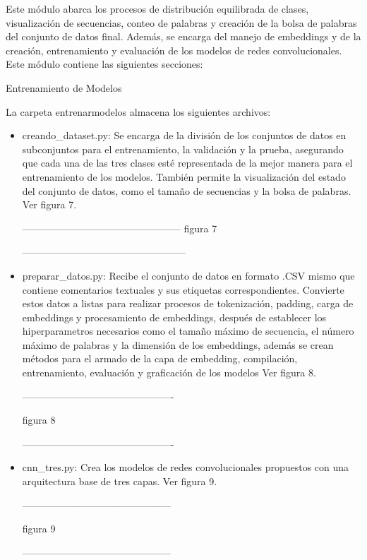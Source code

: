 Este módulo abarca los procesos de distribución equilibrada de clases, visualización de secuencias, conteo de palabras y creación de la bolsa de palabras del conjunto de datos final. Además, se encarga del manejo de embeddings y de la creación, entrenamiento y evaluación de los modelos de redes convolucionales. Este módulo contiene las siguientes secciones:

Entrenamiento de Modelos

La carpeta entrenarmodelos almacena los siguientes archivos:

\begin{itemize}

\item creando\_dataset.py: Se encarga de la división de los conjuntos de datos en subconjuntos para el entrenamiento, la validación y la prueba, asegurando que cada una de las tres clases esté representada de la mejor manera para el entrenamiento de los modelos. También permite la visualización del estado del conjunto de datos, como el tamaño de secuencias y la bolsa de palabras. Ver figura 7.

------------------------------------------------
figura 7

--------------------------------------------------

\item preparar\_datos.py: Recibe el conjunto de datos en formato .CSV mismo que contiene comentarios textuales y sus etiquetas correspondientes. Convierte estos datos a listas para realizar procesos de tokenización, padding, carga de embeddings y procesamiento de embeddings, después de establecer los hiperparametros necesarios como el tamaño máximo de secuencia, el número máximo de palabras y la dimensión de los embeddings, además se crean métodos para el armado de la capa de embedding, compilación, entrenamiento, evaluación y graficación de los modelos Ver figura 8.

----------------------------------------------

figura 8

----------------------------------------------

\item cnn\_tres.py: Crea los modelos de redes convolucionales propuestos con una arquitectura base de tres capas. Ver figura 9.

---------------------------------------------

figura 9

---------------------------------------------


\end{itemize}
